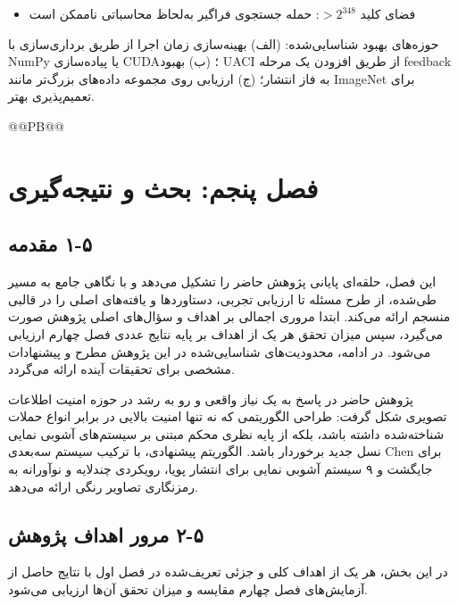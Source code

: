 \begin{itemize}
    \item فضای کلید $> 2^{348}$: حمله جستجوی فراگیر به‌لحاظ محاسباتی ناممکن است
\end{itemize}

حوزه‌های بهبود شناسایی‌شده:  (الف) بهینه‌سازی زمان اجرا از طریق برداری‌سازی با NumPy یا پیاده‌سازی CUDA؛ (ب) بهبود UACI از طریق افزودن یک مرحله feedback به فاز انتشار؛ (ج) ارزیابی روی مجموعه داده‌های بزرگ‌تر مانند ImageNet برای تعمیم‌پذیری بهتر.


@@PB@@



\chapter{فصل پنجم: بحث و نتیجه‌گیری}
\section{‏۵‏-‏۱‏ مقدمه}

این فصل، حلقه‌ای پایانی پژوهش حاضر را تشکیل می‌دهد و با نگاهی جامع به مسیر طی‌شده، از طرح مسئله تا ارزیابی تجربی، دستاوردها و یافته‌های اصلی را در قالبی منسجم ارائه می‌کند. ابتدا مروری اجمالی بر اهداف و سؤال‌های اصلی پژوهش صورت می‌گیرد، سپس میزان تحقق هر یک از اهداف بر پایه نتایج عددی فصل چهارم ارزیابی می‌شود. در ادامه، محدودیت‌های شناسایی‌شده در این پژوهش مطرح و پیشنهادات مشخصی برای تحقیقات آینده ارائه می‌گردد.

پژوهش حاضر در پاسخ به یک نیاز واقعی و رو به رشد در حوزه امنیت اطلاعات تصویری شکل گرفت: طراحی الگوریتمی که نه تنها امنیت بالایی در برابر انواع حملات شناخته‌شده داشته باشد، بلکه از پایه نظری محکم مبتنی بر سیستم‌های آشوبی نمایی نسل جدید برخوردار باشد. الگوریتم پیشنهادی، با ترکیب سیستم سه‌بعدی Chen برای جایگشت و ۹ سیستم آشوبی نمایی برای انتشار پویا، رویکردی چندلایه و نوآورانه به رمزنگاری تصاویر رنگی ارائه می‌دهد.

\section{‏۵‏-‏۲‏ مرور اهداف پژوهش}

در این بخش، هر یک از اهداف کلی و جزئی تعریف‌شده در فصل اول با نتایج حاصل از آزمایش‌های فصل چهارم مقایسه و میزان تحقق آن‌ها ارزیابی می‌شود.

